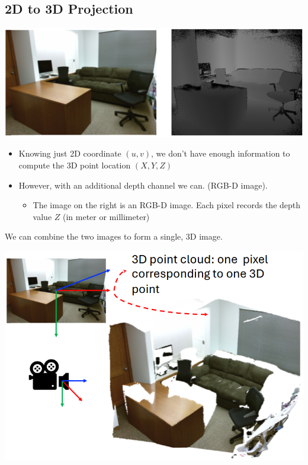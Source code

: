 \documentclass[10pt]{article}
\begin{document}
\subsection*{2D to 3D Projection}
\begin{center} 
	\includegraphics*[width=\textwidth]{L1_28.png} 
\end{center}
\begin{itemize}
	\item Knowing just 2D coordinate $(u, v)$, we don't have enough information to compute the 3D point location $(X, Y, Z)$
	\item However, with an additional depth channel we can. (RGB-D image).
	\begin{itemize}
        \item The image on the right is an RGB-D image.  Each pixel records the depth value $Z$ (in meter or millimeter)
    \end{itemize}
\end{itemize}
We can combine the two images to form a single, 3D image.
\begin{center} 
	\includegraphics*[width=\textwidth]{L1_29.png} 
\end{center}
\end{document}
